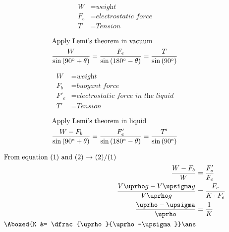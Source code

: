 \documentclass{article}
\begin{document}
\begin{align*}
W &= \textit{weight}\\
F_e &= \textit{electrostatic force}\\
T &= \textit{Tension}
\end{align*}

\begin{align}
\intertext{Apply Lemi's theorem in vacuum}
\dfrac{W}{\sin\left(90^\circ + \theta\right)} = 
\dfrac{F_e}{\sin\left(180^\circ-\theta\right)} =
\dfrac{T}{\sin\left(90^\circ\right)}
\end{align}
\pagebreak

\begin{center}
\end{center}

\begin{align*}
W &= \textit{weight}\\
F_b &= \textit{buoyant force}\\
F'_e &= \textit{electrostatic force in the liquid}\\
T' &= \textit{Tension}
\end{align*}

\begin{align}
\intertext{Apply Lemi's theorem in liquid}
\dfrac{W-F_b}{\sin\left(90^\circ + \theta\right)} = 
\dfrac{F'_e}{\sin\left(180^\circ-\theta\right)} =
\dfrac{T'}{\sin\left(90^\circ\right)}
\end{align}
\pagebreak

\addtolength{\jot}{2ex}
\begin{align*}
\intertext{From equation (1) and (2) $\rightarrow$ (2)/(1)}
\dfrac{W-F_b}{W} &= \dfrac{F'_e}{F_e}\\
\dfrac{V\uprho g - V\upsigma g}{V\uprho g} &= \dfrac{F_e}{K\cdot F_e}\\
\dfrac{\uprho-\upsigma}{\uprho} &= \dfrac{1}{K}\\
\Aboxed{K &= \dfrac{\uprho}{\uprho-\upsigma}}\ans
\end{align*}


\pagebreak
\vspace*{\fill}
\begin{center}
	\fbox{\qrcode[height=2cm]{\gdrive}}
\end{center}
\vspace*{\fill}
\end{document}
